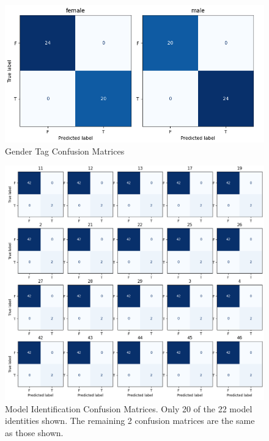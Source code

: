 \documentclass[journal]{new-aiaa}
\begin{document}
\begin{figure}[H]
  \centering
  \includegraphics[width=.7\textwidth]{figures/gender_tag_cm.png}
  \caption{Gender Tag Confusion Matrices}
  \label{fig:Gender Confusion Matrices}
\end{figure}

\begin{figure}[H]
  \centering
  \includegraphics[width=.90\textwidth]{figures/model_id_tag_cm.png}
  \caption{Model Identification Confusion Matrices. Only 20 of the 22 model identities shown. The remaining 2 confusion matrices are the same as those shown.}
  \label{fig:Model Identification Confusion Matrices}
\end{figure}
\end{document}
